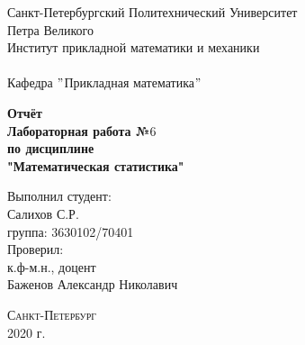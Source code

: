 \documentclass[a4]{article}
\begin{document}
	\def\contentsname{\LARGE{Содержание}}
	\thispagestyle{empty}
	\begin{center} 
		\vspace{2cm} 
		{\Large \sc Санкт-Петербургский Политехнический Университет}\\
		\vspace{2mm}
		{\Large\sc Петра Великого}\\
		\vspace{1cm}
		{\large \sc Институт прикладной математики и механики\\ 
			\vspace{0.5mm}
			\textsc{}}\\ 
		\vspace{0.5mm}
		{\large\sc Кафедра $"$Прикладная математика$"$}\\
		\vspace{15mm}
		
		
		{\sc \textbf{Отчёт\\
			Лабораторная работа №$6$\\
			по дисциплине\\
			"Математическая статистика"}
			\vspace{6mm}
			
		}
		\vspace*{2mm}
		
		
		\begin{flushleft}
			\vspace{4cm}
			\sc Выполнил студент:\\
			\sc Салихов С.Р.\\
			\sc группа: 3630102/70401\\
			\vspace{1cm}
			\sc Проверил:\\
			\sc к.ф-м.н., доцент\\
			\sc Баженов Александр Николавич
			\vspace{20mm}
		\end{flushleft}
	\end{center} 
	\begin{center}
		\vfill {\large\textsc{Санкт-Петербург}}\\ 
		2020 г.
	\end{center}
	
	\newpage
	\pagestyle{plain}
	
	
	
\end{document}

